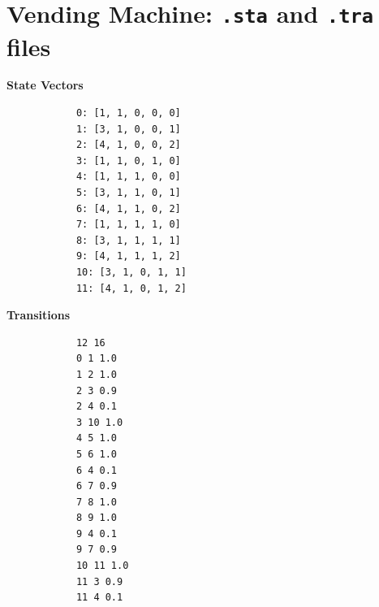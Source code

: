 \section{Vending Machine: \texttt{.sta} and \texttt{.tra} files}
\label{sec:tra-sta-vending-machine}
\begin{listing}[h]
	\centering
	\small %
	
	\begin{minipage}[t]{0.48\textwidth}
		\centering
		\textbf{State Vectors} \\
		\begin{verbatim}
			0: [1, 1, 0, 0, 0]
			1: [3, 1, 0, 0, 1]
			2: [4, 1, 0, 0, 2]
			3: [1, 1, 0, 1, 0]
			4: [1, 1, 1, 0, 0]
			5: [3, 1, 1, 0, 1]
			6: [4, 1, 1, 0, 2]
			7: [1, 1, 1, 1, 0]
			8: [3, 1, 1, 1, 1]
			9: [4, 1, 1, 1, 2]
			10: [3, 1, 0, 1, 1]
			11: [4, 1, 0, 1, 2]
		\end{verbatim}
	\end{minipage}
	\hfill %
	\begin{minipage}[t]{0.48\textwidth}
		\centering
		\textbf{Transitions} \\
		\begin{verbatim}
			12 16
			0 1 1.0
			1 2 1.0
			2 3 0.9
			2 4 0.1
			3 10 1.0
			4 5 1.0
			5 6 1.0
			6 4 0.1
			6 7 0.9
			7 8 1.0
			8 9 1.0
			9 4 0.1
			9 7 0.9
			10 11 1.0
			11 3 0.9
			11 4 0.1
		\end{verbatim}
	\end{minipage}
	
	\caption{State vector mapping (\texttt{.sta}, left) and the resulting transition matrix (\texttt{.tra}, right) for the VendingMachine example}
	\label{lst:vending-states-matrix}
\end{listing}
\newpage
